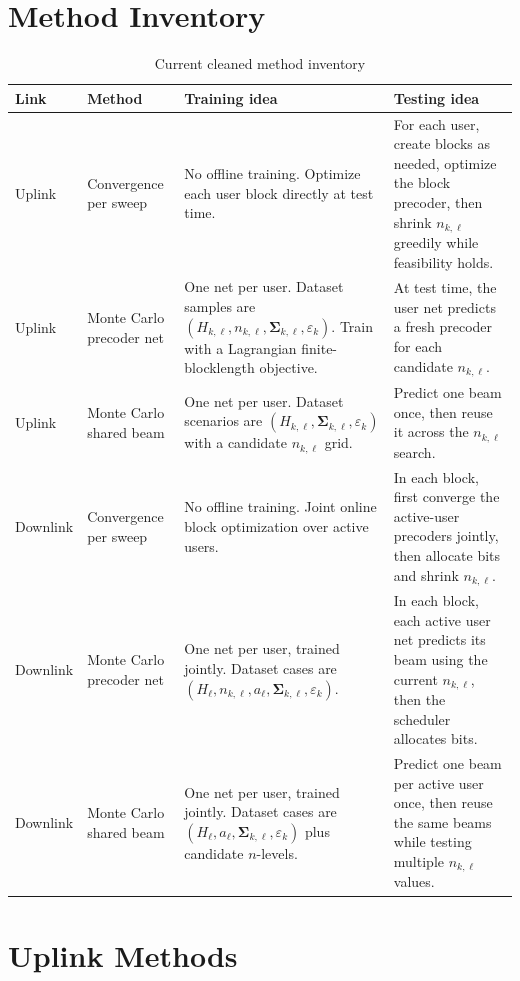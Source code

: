 \documentclass[11pt]{article}
\newcommand{\Sig}{\mathbf{\Sigma}}
\begin{document}
\section{Method Inventory}
\begin{table}[ht]
\centering
\small
\caption{Current cleaned method inventory}
\renewcommand{\arraystretch}{1.15}
\begin{tabularx}{\textwidth}{>{\raggedright\arraybackslash}p{} >{\raggedright\arraybackslash}p{} X X}
\toprule
Link & Method & Training idea & Testing idea \\
\midrule
Uplink & Convergence per sweep & No offline training. Optimize each user block directly at test time. & For each user, create blocks as needed, optimize the block precoder, then shrink \(n_{k,\ell}\) greedily while feasibility holds. \\
Uplink & Monte Carlo precoder net & One net per user. Dataset samples are \((H_{k,\ell}, n_{k,\ell}, \Sig_{k,\ell}, \varepsilon_k)\). Train with a Lagrangian finite-blocklength objective. & At test time, the user net predicts a fresh precoder for each candidate \(n_{k,\ell}\). \\
Uplink & Monte Carlo shared beam & One net per user. Dataset scenarios are \((H_{k,\ell}, \Sig_{k,\ell}, \varepsilon_k)\) with a candidate \(n_{k,\ell}\) grid. & Predict one beam once, then reuse it across the \(n_{k,\ell}\) search. \\
Downlink & Convergence per sweep & No offline training. Joint online block optimization over active users. & In each block, first converge the active-user precoders jointly, then allocate bits and shrink \(n_{k,\ell}\). \\
Downlink & Monte Carlo precoder net & One net per user, trained jointly. Dataset cases are \((H_{\ell}, n_{k,\ell}, a_{\ell}, \Sig_{k,\ell}, \varepsilon_k)\). & In each block, each active user net predicts its beam using the current \(n_{k,\ell}\), then the scheduler allocates bits. \\
Downlink & Monte Carlo shared beam & One net per user, trained jointly. Dataset cases are \((H_{\ell}, a_{\ell}, \Sig_{k,\ell}, \varepsilon_k)\) plus candidate \(n\)-levels. & Predict one beam per active user once, then reuse the same beams while testing multiple \(n_{k,\ell}\) values. \\
\bottomrule
\end{tabularx}
\end{table}

\section{Uplink Methods}
\end{document}
